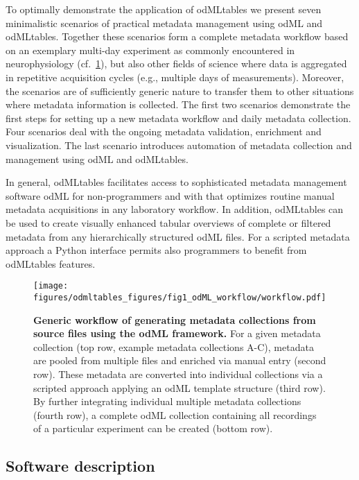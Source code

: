{To optimally demonstrate the application of odMLtables we present seven minimalistic scenarios of practical metadata management using odML and odMLtables. Together these scenarios form a complete metadata workflow based on an exemplary multi-day experiment as commonly encountered in neurophysiology (cf.~\cref{fig:odMLgeneration}), but also other fields of science where data is aggregated in repetitive acquisition cycles (e.g., multiple days of measurements). Moreover, the scenarios are of sufficiently generic nature to transfer them to other situations where metadata information is collected. The first two scenarios demonstrate the first steps for setting up a new metadata workflow and daily metadata collection. Four scenarios deal with the ongoing metadata validation, enrichment and visualization. The last scenario introduces automation of metadata collection and management using odML and odMLtables.

In general, odMLtables facilitates access to sophisticated metadata management software odML for non-programmers and with that optimizes routine manual metadata acquisitions in any laboratory workflow. In addition, odMLtables can be used to create visually enhanced tabular overviews of complete or filtered metadata from any hierarchically structured odML files. For a scripted metadata approach a Python interface permits also programmers to benefit from odMLtables features.

\begin{figure}[!ht]
\begin{center}
\texttt{[image: figures/odmltables\_figures/fig1\_odML\_workflow/workflow.pdf]}
\caption[Generic workflow of generating metadata collections from source files using the odML framework]{{\label{fig:odMLgeneration}
\textbf{Generic workflow of generating metadata collections from source files using the odML framework.} For a given metadata collection (top row, example metadata collections A-C), metadata are pooled from multiple files and enriched via manual entry (second row). These metadata are converted into individual collections via a scripted approach applying an odML template structure (third row). By further integrating individual multiple metadata collections (fourth row), a complete odML collection containing all recordings of a particular experiment can be created (bottom row).
}}
\end{center}
\end{figure}

\subsection{Software description}
\label{sec:Software}

}
